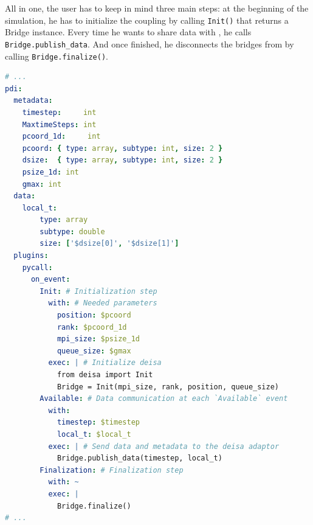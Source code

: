 All in one, the user has to keep in mind three main steps: at the beginning of the simulation, he has to initialize the coupling by calling \texttt{Init()} that returns a Bridge instance. Every time he wants to share data with \dask, he calls \texttt{Bridge.publish\_data}. And once finished, he disconnects the bridges from \dask by calling \texttt{Bridge.finalize()}.

\begin{lstlisting}[escapeinside={\#}, float, label=list:ymldeisa, language=yaml, caption= Deisa configuration file]
# ...
pdi:
  metadata:
    timestep:     int
    MaxtimeSteps: int 
    pcoord_1d:     int
    pcoord: { type: array, subtype: int, size: 2 }
    dsize:  { type: array, subtype: int, size: 2 }
    psize_1d: int 
    gmax: int 
  data:
    local_t: 
        type: array
        subtype: double
        size: ['$dsize[0]', '$dsize[1]']
  plugins:
    pycall:
      on_event:
        Init: # Initialization step
          with: # Needed parameters
            position: $pcoord
            rank: $pcoord_1d
            mpi_size: $psize_1d
            queue_size: $gmax
          exec: | # Initialize deisa
            from deisa import Init
            Bridge = Init(mpi_size, rank, position, queue_size)
        Available: # Data communication at each `Available` event
          with: 
            timestep: $timestep
            local_t: $local_t
          exec: | # Send data and metadata to the deisa adaptor 
            Bridge.publish_data(timestep, local_t) 
        Finalization: # Finalization step
          with: ~
          exec: | 
            Bridge.finalize()
# ...
\end{lstlisting}



